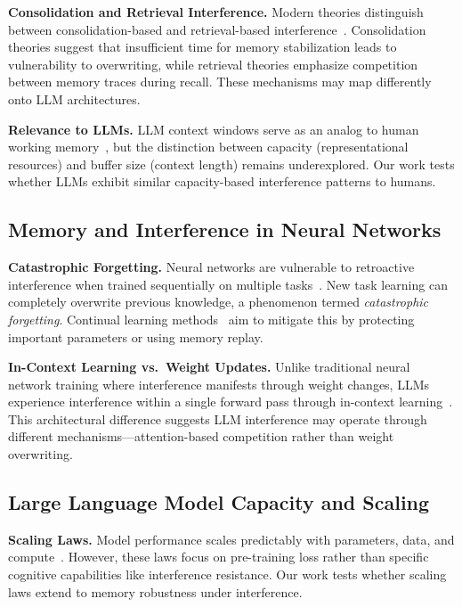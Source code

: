 \documentclass{article}
\begin{document}
\textbf{Consolidation and Retrieval Interference.} Modern theories distinguish between consolidation-based and retrieval-based interference~\citep{wixted2004consolidation}. Consolidation theories suggest that insufficient time for memory stabilization leads to vulnerability to overwriting, while retrieval theories emphasize competition between memory traces during recall. These mechanisms may map differently onto LLM architectures.

\textbf{Relevance to LLMs.} LLM context windows serve as an analog to human working memory~\citep{liu2024unable}, but the distinction between capacity (representational resources) and buffer size (context length) remains underexplored. Our work tests whether LLMs exhibit similar capacity-based interference patterns to humans.

\subsection{Memory and Interference in Neural Networks}

\textbf{Catastrophic Forgetting.} Neural networks are vulnerable to retroactive interference when trained sequentially on multiple tasks~\citep{mccloskey1989catastrophic, french1999catastrophic}. New task learning can completely overwrite previous knowledge, a phenomenon termed \textit{catastrophic forgetting}. Continual learning methods~\citep{kirkpatrick2017overcoming, zenke2017continual} aim to mitigate this by protecting important parameters or using memory replay.

\textbf{In-Context Learning vs.\ Weight Updates.} Unlike traditional neural network training where interference manifests through weight changes, LLMs experience interference within a single forward pass through in-context learning~\citep{brown2020gpt3}. This architectural difference suggests LLM interference may operate through different mechanisms---attention-based competition rather than weight overwriting.

\subsection{Large Language Model Capacity and Scaling}

\textbf{Scaling Laws.} Model performance scales predictably with parameters, data, and compute~\citep{kaplan2020scaling, hoffmann2022chinchilla}. However, these laws focus on pre-training loss rather than specific cognitive capabilities like interference resistance. Our work tests whether scaling laws extend to memory robustness under interference.
\end{document}
